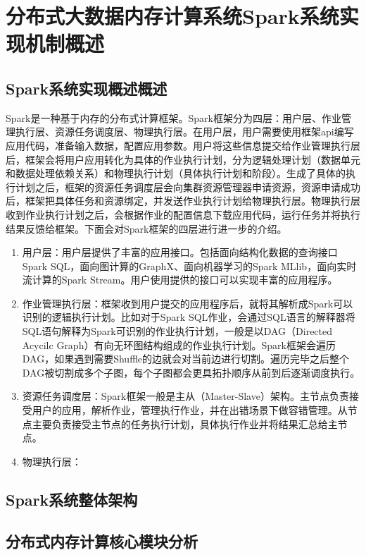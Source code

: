 \chapter{分布式大数据内存计算系统Spark系统实现机制概述}\label{chap:basic}
\section{Spark系统实现概述概述}
Spark是一种基于内存的分布式计算框架。Spark框架分为四层：用户层、作业管理执行层、资源任务调度层、物理执行层。在用户层，用户需要使用框架api编写应用代码，准备输入数据，配置应用参数。用户将这些信息提交给作业管理执行层后，框架会将用户应用转化为具体的作业执行计划，分为逻辑处理计划（数据单元和数据处理依赖关系）和物理执行计划（具体执行计划和阶段）。生成了具体的执行计划之后，框架的资源任务调度层会向集群资源管理器申请资源，资源申请成功后，框架把具体任务和资源绑定，并发送作业执行计划给物理执行层。物理执行层收到作业执行计划之后，会根据作业的配置信息下载应用代码，运行任务并将执行结果反馈给框架。下面会对Spark框架的四层进行进一步的介绍。

\begin{enumerate}
    \item 用户层：用户层提供了丰富的应用接口。包括面向结构化数据的查询接口Spark SQL，面向图计算的GraphX、面向机器学习的Spark MLlib，面向实时流计算的Spark Stream。用户使用提供的接口可以实现丰富的应用程序。
    \item 作业管理执行层：框架收到用户提交的应用程序后，就将其解析成Spark可以识别的逻辑执行计划。比如对于Spark SQL作业，会通过SQL语言的解释器将SQL语句解释为Spark可识别的作业执行计划，一般是以DAG（Directed Acycilc Graph）有向无环图结构组成的作业执行计划。Spark框架会遍历DAG，如果遇到需要Shuffle的边就会对当前边进行切割。遍历完毕之后整个DAG被切割成多个子图，每个子图都会更具拓扑顺序从前到后逐渐调度执行。
    \item 资源任务调度层：Spark框架一般是主从（Master-Slave）架构。主节点负责接受用户的应用，解析作业，管理执行作业，并在出错场景下做容错管理。从节点主要负责接受主节点的任务执行计划，具体执行作业并将结果汇总给主节点。
    \item 物理执行层：
\end{enumerate}

\section{Spark系统整体架构}
\section{分布式内存计算核心模块分析}
